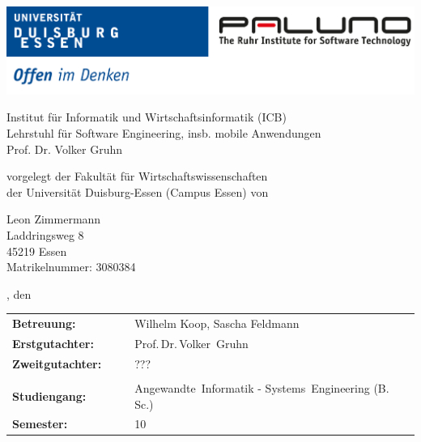 \pagestyle{empty} %

\includegraphics[width=\textwidth]{./img/logo_unidue_paluno_deutsch.pdf}

\begin{sffamily}

\begin{center}

\vspace*{0.7cm}

\normalsize{Institut für Informatik und Wirtschaftsinformatik (ICB)\\%
Lehrstuhl für Software Engineering, insb. mobile Anwendungen\\
Prof. Dr. Volker Gruhn}


\vspace*{2.5cm}

\LARGE{\documentHeading}

\vspace*{1cm}

\large{\documentType}

\vspace*{2.5cm}

\normalsize{vorgelegt der Fakultät für Wirtschaftswissenschaften\\
der Universität Duisburg-Essen (Campus Essen) von}

\vspace*{\baselineskip}

\normalsize{
Leon Zimmermann \\
Laddringsweg 8 \\
45219 Essen \\
Matrikelnummer: 3080384
}

\vspace*{1.5cm}

\small{\documentLocation, den \documentDate}

\vspace*{1.5cm}

\normalsize{
\begin{tabular*}{\linewidth}{p{0.3\linewidth}p{0.7\linewidth}}
\textbf{Betreuung:}      & Wilhelm Koop, Sascha Feldmann\\
\textbf{Erstgutachter:}  & Prof.\,Dr.\,Volker~Gruhn\\
\textbf{Zweitgutachter:} & ???\\
\\
\textbf{Studiengang:}    & Angewandte~Informatik - Systems~Engineering (B.\,Sc.)\\
\textbf{Semester:}       & 10
\end{tabular*}
}

\end{center}

\end{sffamily}
\clearpage